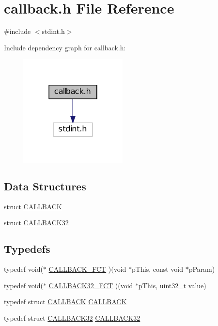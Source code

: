 \hypertarget{a00466}{
\section{callback.h File Reference}
\label{a00466}
}
{\ttfamily \#include $<$stdint.h$>$}\par
Include dependency graph for callback.h:
\nopagebreak
\begin{figure}[H]
\begin{center}
\leavevmode
\includegraphics[width=154pt]{a00692}
\end{center}
\end{figure}
\subsection*{Data Structures}
\begin{DoxyCompactItemize}
\item 
struct \hyperlink{a00008}{CALLBACK}
\item 
struct \hyperlink{a00009}{CALLBACK32}
\end{DoxyCompactItemize}
\subsection*{Typedefs}
\begin{DoxyCompactItemize}
\item 
typedef void($\ast$ \hyperlink{a00466_ab3b2472495860a1aec38b904c5ac0522}{CALLBACK\_\-FCT} )(void $\ast$pThis, const void $\ast$pParam)
\item 
typedef void($\ast$ \hyperlink{a00466_a2c7065cf157f660a6d0ff87a54557e3c}{CALLBACK32\_\-FCT} )(void $\ast$pThis, uint32\_\-t value)
\item 
typedef struct \hyperlink{a00008}{CALLBACK} \hyperlink{a00466_adf4a34e2218cc4d030a3c4c114f2aec4}{CALLBACK}
\item 
typedef struct \hyperlink{a00009}{CALLBACK32} \hyperlink{a00466_a739fda39fcdba5f5452566a5f00330cc}{CALLBACK32}
\end{DoxyCompactItemize}


